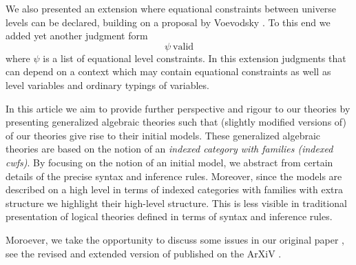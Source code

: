 \documentclass[11pt,a4paper]{article}
\theoremstyle{definition}
\begin{document}
We also presented an extension where equational constraints between universe levels can be declared, building on a proposal by Voevodsky \cite{VV}. To this end we added yet another judgment form
$$
\psi\ \mathrm{valid}
$$
where $\psi$ is a list of equational level constraints. 
In this extension judgments that can depend on a context which may contain equational constraints as well as level variables and ordinary typings of variables.

In this article we aim to provide further perspective and rigour to our theories by presenting generalized algebraic theories such that (slightly modified versions of) of our theories give rise to their initial models. These generalized algebraic theories are based on the notion of an {\em indexed category with families (indexed cwfs)}.
By focusing on the notion of an initial model, we abstract from certain details of the precise syntax and inference rules.  Moreover, since the models are described on a high level in terms of indexed categories with families with extra structure we highlight their high-level structure. This is less visible in traditional presentation of logical theories defined in terms of syntax and inference rules. 
 
Moroever, we take the opportunity to discuss some issues in our original paper \cite{BezemCDE22}, see the revised and extended version of published on the ArXiV \cite{BezemCDE22:revised}.
\end{document}
